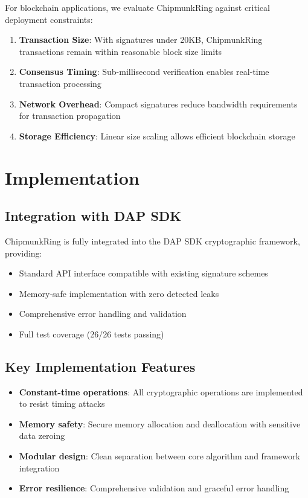 \documentclass[11pt,a4paper]{article}
\begin{document}
For blockchain applications, we evaluate ChipmunkRing against critical deployment constraints:

\begin{enumerate}
\item \textbf{Transaction Size}: With signatures under 20KB, ChipmunkRing transactions remain within reasonable block size limits
\item \textbf{Consensus Timing}: Sub-millisecond verification enables real-time transaction processing
\item \textbf{Network Overhead}: Compact signatures reduce bandwidth requirements for transaction propagation
\item \textbf{Storage Efficiency}: Linear size scaling allows efficient blockchain storage
\end{enumerate}

\section{Implementation}

\subsection{Integration with DAP SDK}

ChipmunkRing is fully integrated into the DAP SDK cryptographic framework, providing:

\begin{itemize}
\item Standard API interface compatible with existing signature schemes
\item Memory-safe implementation with zero detected leaks
\item Comprehensive error handling and validation
\item Full test coverage (26/26 tests passing)
\end{itemize}

\subsection{Key Implementation Features}

\begin{itemize}
\item \textbf{Constant-time operations}: All cryptographic operations are implemented to resist timing attacks
\item \textbf{Memory safety}: Secure memory allocation and deallocation with sensitive data zeroing
\item \textbf{Modular design}: Clean separation between core algorithm and framework integration
\item \textbf{Error resilience}: Comprehensive validation and graceful error handling
\end{itemize}
\end{document}
